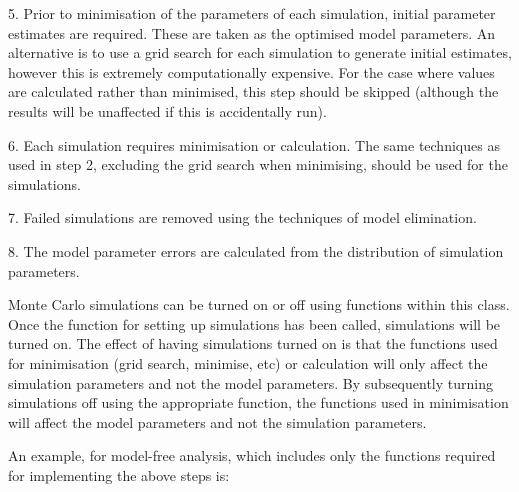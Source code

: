 5.  Prior to minimisation  of the parameters of each simulation, initial parameter estimates
are required.  These are taken as the optimised  model parameters.  An alternative is to use
a grid search for each simulation to generate initial estimates, however this is extremely
computationally expensive.  For the case where values are calculated rather than minimised, 
this step should be skipped (although the results will be unaffected if this is accidentally
run).

6.  Each simulation requires minimisation  or calculation.  The same techniques as used in
step 2, excluding the grid search when minimising, should be used for the simulations.

7.  Failed simulations are removed using the techniques of model elimination.  

8.  The model parameter errors are calculated from the distribution of simulation
parameters.


Monte Carlo simulations can be turned on or off using functions within this class.  Once the
function for setting up simulations has been called, simulations will be turned on.  The
effect of having simulations turned on is that the functions used for minimisation  (grid
search, minimise,  etc) or calculation will only affect the simulation parameters and not the
model parameters.  By subsequently turning simulations off using the appropriate function,
the functions used in minimisation  will affect the model parameters and not the simulation
parameters.


An example, for model-free analysis, which includes only the functions required for
implementing the above steps is:






